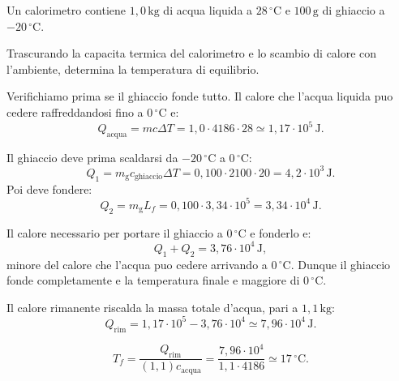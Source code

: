 
\begin{esercizio}
Un calorimetro contiene \(1{,}0\,\mathrm{kg}\) di acqua liquida a
\(28\,^\circ\mathrm{C}\) e \(100\,\mathrm{g}\) di ghiaccio a
\(-20\,^\circ\mathrm{C}\).

Trascurando la capacita termica del calorimetro e lo scambio di calore con
l'ambiente, determina la temperatura di equilibrio.
\end{esercizio}

\begin{soluzione}
Verifichiamo prima se il ghiaccio fonde tutto. Il calore che l'acqua liquida
puo cedere raffreddandosi fino a \(0\,^\circ\mathrm{C}\) e:
\[
Q_\text{acqua}=m c \Delta T
=1{,}0\cdot 4186\cdot 28
\simeq 1{,}17\cdot 10^5\,\mathrm{J}.
\]

Il ghiaccio deve prima scaldarsi da \(-20\,^\circ\mathrm{C}\) a
\(0\,^\circ\mathrm{C}\):
\[
Q_1=m_\text{g}c_\text{ghiaccio}\Delta T
=0{,}100\cdot 2100\cdot 20
=4{,}2\cdot 10^3\,\mathrm{J}.
\]
Poi deve fondere:
\[
Q_2=m_\text{g}L_f
=0{,}100\cdot 3{,}34\cdot 10^5
=3{,}34\cdot 10^4\,\mathrm{J}.
\]

Il calore necessario per portare il ghiaccio a \(0\,^\circ\mathrm{C}\) e
fonderlo e:
\[
Q_1+Q_2=3{,}76\cdot 10^4\,\mathrm{J},
\]
minore del calore che l'acqua puo cedere arrivando a
\(0\,^\circ\mathrm{C}\). Dunque il ghiaccio fonde completamente e la
temperatura finale e maggiore di \(0\,^\circ\mathrm{C}\).

Il calore rimanente riscalda la massa totale d'acqua, pari a
\(1{,}1\,\mathrm{kg}\):
\[
Q_\text{rim}=1{,}17\cdot 10^5-3{,}76\cdot 10^4
\simeq 7{,}96\cdot 10^4\,\mathrm{J}.
\]

\[
T_f=\frac{Q_\text{rim}}{(1{,}1)c_\text{acqua}}
=\frac{7{,}96\cdot 10^4}{1{,}1\cdot 4186}
\simeq 17\,^\circ\mathrm{C}.
\]
\end{soluzione}
